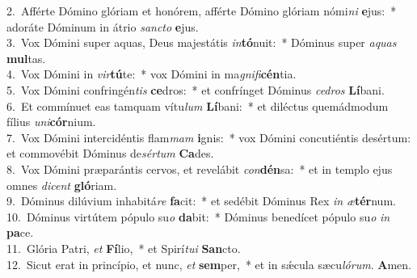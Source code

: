 {2.~}Afférte Dómino glóriam et honórem, afférte Dómino glóriam nómi\textit{ni} \textbf{e}jus:~* adoráte Dóminum in átrio \textit{san}\textit{cto} \textbf{e}jus.\\
{3.~}Vox Dómini super aquas, Deus majestátis \textit{in}\textbf{tó}nuit:~* Dóminus super \textit{a}\textit{quas} \textbf{mul}tas.\\
{4.~}Vox Dómini in \textit{vir}\textbf{tú}te:~* vox Dómini in ma\textit{gni}\textit{fi}\textbf{cén}tia.\\
{5.~}Vox Dómini confringén\textit{tis} \textbf{ce}dros:~* et confrínget Dóminus \textit{ce}\textit{dros} \textbf{Lí}bani.\\
{6.~}Et commínuet eas tamquam vítu\textit{lum} \textbf{Lí}bani:~* et diléctus quemádmodum fílius \textit{u}\textit{ni}\textbf{cór}nium.\\
{7.~}Vox Dómini intercidéntis flam\textit{mam} \textbf{i}gnis:~* vox Dómini concutiéntis desértum: et commovébit Dóminus de\textit{sér}\textit{tum} \textbf{Ca}des.\\
{8.~}Vox Dómini præparántis cervos, et revelábit \textit{con}\textbf{dén}sa:~* et in templo ejus omnes \textit{di}\textit{cent} \textbf{gló}riam.\\
{9.~}Dóminus dilúvium inhabitá\textit{re} \textbf{fa}cit:~* et sedébit Dóminus Rex \textit{in} \textit{æ}\textbf{tér}num.\\
{10.~}Dóminus virtútem pópulo su\textit{o} \textbf{da}bit:~* Dóminus benedícet pópulo su\textit{o} \textit{in} \textbf{pa}ce.\\
{11.~}Glória Patri, \textit{et} \textbf{Fí}lio,~* et Spirí\textit{tu}\textit{i} \textbf{San}cto.\\
{12.~}Sicut erat in princípio, et nunc, \textit{et} \textbf{sem}per,~* et in sǽcula sæcu\textit{ló}\textit{rum}. \textbf{A}men.\\
